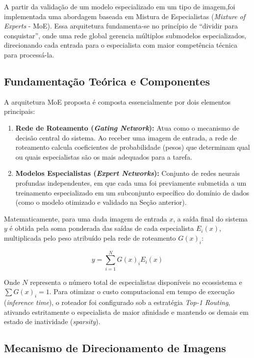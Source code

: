 \documentclass[12pt]{article}
\begin{document}
A partir da validação de um modelo especializado em um tipo de imagem,foi implementada uma abordagem baseada em Mistura de Especialistas (\textit{Mixture of Experts} - MoE). Essa arquitetura fundamenta-se no princípio de ``dividir para conquistar'', onde uma rede global gerencia múltiplos submodelos especializados, direcionando cada entrada para o especialista com maior competência técnica para processá-la.

\subsection{Fundamentação Teórica e Componentes}

A arquitetura MoE proposta é composta essencialmente por dois elementos principais:

\begin{enumerate}
    \item \textbf{Rede de Roteamento (\textit{Gating Network}):} Atua como o mecanismo de decisão central do sistema. Ao receber uma imagem de entrada, a rede de roteamento calcula coeficientes de probabilidade (pesos) que determinam qual ou quais especialistas são os mais adequados para a tarefa.
    \item \textbf{Modelos Especialistas (\textit{Expert Networks}):} Conjunto de redes neurais profundas independentes, em que cada uma foi previamente submetida a um treinamento especializado em um subconjunto específico do domínio de dados (como o modelo otimizado e validado na Seção anterior).
    
\end{enumerate}

Matematicamente, para uma dada imagem de entrada $x$, a saída final do sistema $y$ é obtida pela soma ponderada das saídas de cada especialista $E_i(x)$, multiplicada pelo peso atribuído pela rede de roteamento $G(x)_i$:

\begin{equation}
y = \sum_{i=1}^{N} G(x)_i E_i(x)
\end{equation}

Onde $N$ representa o número total de especialistas disponíveis no ecossistema e $\sum G(x)_i = 1$. Para otimizar o custo computacional em tempo de execução (\textit{inference time}), o roteador foi configurado sob a estratégia \textit{Top-1 Routing}, ativando estritamente o especialista de maior afinidade e mantendo os demais em estado de inatividade (\textit{sparsity}).

\subsection{Mecanismo de Direcionamento de Imagens}
\end{document}
